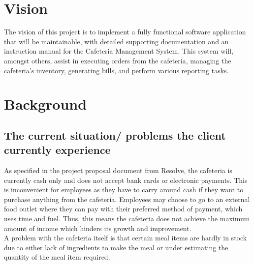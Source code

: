 \documentclass[a4paper,12pt]{report}
\begin{document}
\section{Vision}
The vision of this project is to implement a fully functional software application that will be maintainable, with detailed supporting documentation and an instruction manual for the Cafeteria Management System. This system will, amongst others, assist in executing orders from the cafeteria, managing the cafeteria's inventory, generating bills, and perform various reporting tasks. 

\section{Background}
\subsection{The current situation/ problems the client currently experience}
As specified in the project proposal document from Resolve, the cafeteria is currently cash only and does not accept bank cards or electronic payments. This is inconvenient for employees as they have to carry around cash if they want to purchase anything from the cafeteria. Employees may choose to go to an external food outlet where they can pay with their preferred method of payment, which uses time and fuel. Thus, this means the cafeteria does not achieve the maximum amount of income which hinders its growth and improvement.\\ A problem with the cafeteria itself is that certain meal items are hardly in stock due to either lack of ingredients to make the meal or under estimating the quantity of the meal item required.
\end{document}
